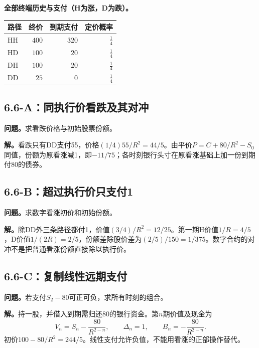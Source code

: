 \documentclass[11pt,a4paper,UTF8,fontset=fandol]{ctexart}
\begin{document}
\textbf{全部终端历史与支付（H为涨，D为跌）。}

\begin{longtable}[]{@{}lrrr@{}}
\toprule\noalign{}
路径 & 终价 & 到期支付 & 定价概率 \\
\midrule\noalign{}
\endhead
\bottomrule\noalign{}
\endlastfoot
HH & \(400\) & \(320\) & \(\frac{1}{4}\) \\
HD & \(100\) & \(20\) & \(\frac{1}{4}\) \\
DH & \(100\) & \(20\) & \(\frac{1}{4}\) \\
DD & \(25\) & \(0\) & \(\frac{1}{4}\) \\
\end{longtable}

\endgroup

\subsection{6.6-A：同执行价看跌及其对冲}\label{aux540cux6267ux884cux4ef7ux770bux8dccux53caux5176ux5bf9ux51b2}

\textbf{问题。}求看跌价格与初始股票份额。

\textbf{解。}看跌只有DD支付55，价格\((1/4)55/R^2=\boxed{44/5}\)。由平价\(P=C+80/R^2-S_0\)同值，份额为原看涨减1，即\(\boxed{-11/75}\)；各时刻银行头寸在原看涨基础上加一份到期付80的债券。

\subsection{6.6-B：超过执行价只支付1}\label{bux8d85ux8fc7ux6267ux884cux4ef7ux53eaux652fux4ed81}

\textbf{问题。}求数字看涨初价和初始份额。

\textbf{解。}除DD外三条路径都付1，价值\((3/4)/R^2=\boxed{12/25}\)。第一期H价值\(1/R=4/5\)，D价值\(1/(2R)=2/5\)，份额差除股价差为\((2/5)/150=\boxed{1/375}\)。数字合约的对冲不是把普通看涨份额直接除以执行价。

\subsection{6.6-C：复制线性远期支付}\label{cux590dux5236ux7ebfux6027ux8fdcux671fux652fux4ed8}

\textbf{问题。}若支付\(S_2-80\)可正可负，求所有时刻的组合。

\textbf{解。}持一股，并借入到期需归还80的银行资金。第\(n\)期价值及现金为
\[\boxed{V_n=S_n-\frac{80}{R^{2-n}},\qquad\Delta_n=1,\qquad B_n=-\frac{80}{R^{2-n}}.}\]
初价\(100-80/R^2=244/5\)。线性支付允许负值，不能用看涨的正部操作替代。
\end{document}
